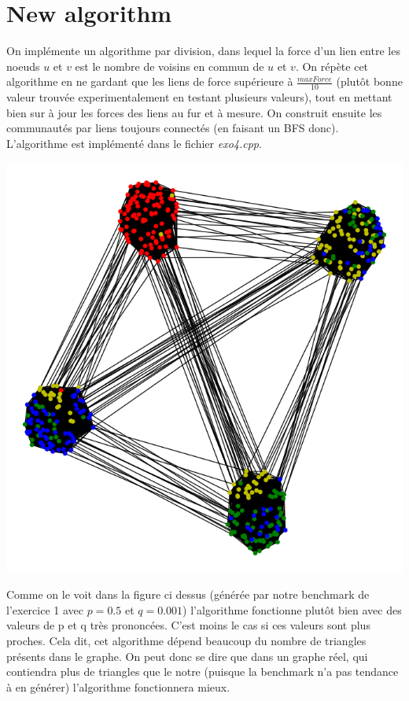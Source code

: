 \documentclass[a4paper]{report}
\begin{document}
\section{New algorithm}
On implémente un algorithme par division, dans lequel la force d'un lien entre les noeuds $u$ et $v$ est le nombre de voisins en commun de $u$ et $v$. On répète cet algorithme en ne gardant que les liens de force supérieure à $\frac{maxForce}{10}$ (plutôt bonne valeur trouvée experimentalement en testant plusieurs valeurs), tout en mettant bien sur à jour les forces des liens au fur et à mesure. On construit ensuite les communautés par liens toujours connectés (en faisant un BFS donc).\\
L'algorithme est implémenté dans le fichier \textit{exo4.cpp}.

\begin{center}
  \includegraphics[width=0.6\paperwidth]{assets/exo4.png}
\end{center}

Comme on le voit dans la figure ci dessus (générée par notre benchmark de l'exercice 1 avec $p = 0.5$ et $q = 0.001$) l'algorithme fonctionne plutôt bien avec des valeurs de p et q très prononcées. C'est moins le cas si ces valeurs sont plus proches. Cela dit, cet algorithme dépend beaucoup du nombre de triangles présents dans le graphe. On peut donc se dire que dans un graphe réel, qui contiendra plus de triangles que le notre (puisque la benchmark n'a pas tendance à en générer) l'algorithme fonctionnera mieux.
\end{document}
